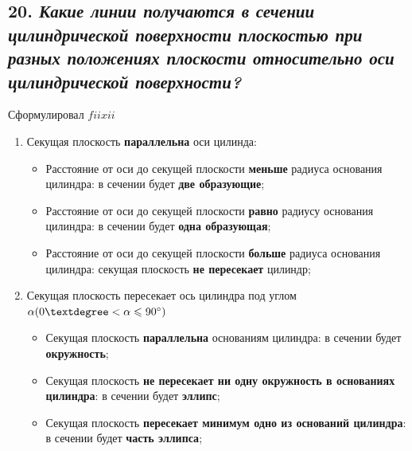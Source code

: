 
\newpage
\subsection*{20. \textit{Какие линии получаются в сечении цилиндрической поверхности плоскостью при разных положениях плоскости относительно оси цилиндрической поверхности?}}

\begin{mainQuote}
    \centering Сформулировал $fiixii$
\end{mainQuote}

\begin{enumerate}
    \item Секущая плоскость {\bf параллельна} оси цилинда:
    \begin{itemize}
        
        \item Расстояние от оси до секущей плоскости {\bf меньше} радиуса основания цилиндра: в сечении будет {\bf две образующие};

        \item Расстояние от оси до секущей плоскости {\bf равно} радиусу основания цилиндра: в сечении будет {\bf одна образующая}; 

        \item Расстояние от оси до секущей плоскости {\bf больше} радиуса основания цилиндра: секущая плоскость {\bf не пересекает} цилиндр;

    \end{itemize}
    \item Секущая плоскость пересекает ось цилиндра под углом $\alpha (0\textdegree < \alpha \leqslant 90\degree)$
    \begin {itemize}

        \item Секущая плоскость {\bf параллельна} основаниям цилиндра: в сечении будет {\bf окружность};

        \item Секущая плоскость {\bf не пересекает ни одну окружность в основаниях цилиндра}: в сечении будет {\bf эллипс};

        \item Секущая плоскость {\bf пересекает минимум одно из оснований цилиндра}: в сечении будет {\bf часть эллипса};

    \end{itemize}
    
\end{enumerate}

